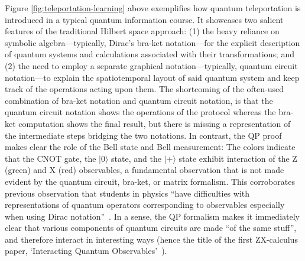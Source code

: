 Figure \ref{fig:teleportation-learning} above exemplifies how quantum teleportation is introduced in a typical quantum information course.
It showcases two salient features of the traditional Hilbert space approach: (1) the heavy reliance on symbolic algebra---typically, Dirac's bra-ket notation---for the explicit description of quantum systems and calculations associated with their transformations; and (2) the need to employ a separate graphical notation---typically, quantum circuit notation---to explain the spatiotemporal layout of said quantum system and keep track of the operations acting upon them.
The shortcoming of the often-used combination of bra-ket notation and quantum circuit notation, is that the quantum circuit notation shows the operations of the protocol whereas the bra-ket computation shows the final result, but there is missing a representation of the intermediate steps bridging the two notations. In contrast, the QP proof makes clear the role of the Bell state and Bell measurement: The colors indicate that the CNOT gate, the $|0\rangle$ state, and the $|+\rangle$ state exhibit interaction of the Z (green) and X (red) observables, a fundamental observation that is not made evident by the quantum circuit, bra-ket, or matrix formalism. This corroborates previous observation that students in physics ``have difficulties with representations of quantum operators corresponding to observables especially when using Dirac notation''~\cite{Marshman2016difficultqoperators}. In a sense, the QP formalism makes it immediately clear that various components of quantum circuits are made ``of the same stuff'', and therefore interact in interesting ways (hence the title of the first ZX-calculus paper, `Interacting Quantum Observables'~\cite{coecke2011interacting}).

